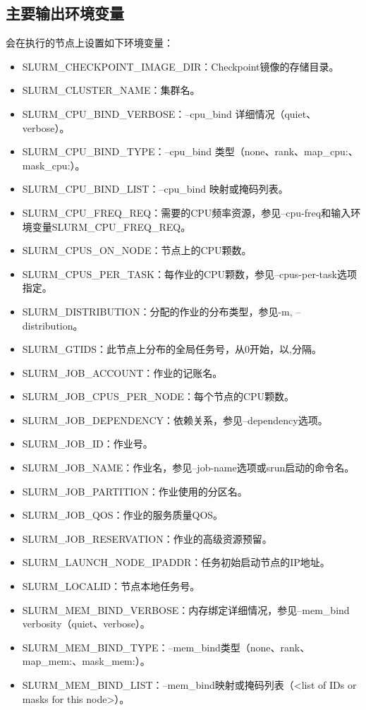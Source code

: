 \subsection{主要输出环境变量}
会在执行的节点上设置如下环境变量：
\begin{itemize}
	\item SLURM\_CHECKPOINT\_IMAGE\_DIR：Checkpoint镜像的存储目录。
	\item SLURM\_CLUSTER\_NAME：集群名。
	\item SLURM\_CPU\_BIND\_VERBOSE：--cpu\_bind 详细情况（quiet、verbose）。
	\item SLURM\_CPU\_BIND\_TYPE：--cpu\_bind 类型（none、rank、map\_cpu:、mask\_cpu:）。
	\item SLURM\_CPU\_BIND\_LIST：--cpu\_bind 映射或掩码列表。
	\item SLURM\_CPU\_FREQ\_REQ：需要的CPU频率资源，参见--cpu-freq和输入环境变量SLURM\_CPU\_FREQ\_REQ。
	\item SLURM\_CPUS\_ON\_NODE：节点上的CPU颗数。
	\item SLURM\_CPUS\_PER\_TASK：每作业的CPU颗数，参见--cpus-per-task选项指定。
	\item SLURM\_DISTRIBUTION：分配的作业的分布类型，参见-m, --distribution。
	\item SLURM\_GTIDS：此节点上分布的全局任务号，从0开始，以,分隔。
	\item SLURM\_JOB\_ACCOUNT：作业的记账名。
	\item SLURM\_JOB\_CPUS\_PER\_NODE：每个节点的CPU颗数。
	\item SLURM\_JOB\_DEPENDENCY：依赖关系，参见--dependency选项。
	\item SLURM\_JOB\_ID：作业号。
	\item SLURM\_JOB\_NAME：作业名，参见--job-name选项或srun启动的命令名。
	\item SLURM\_JOB\_PARTITION：作业使用的分区名。
	\item SLURM\_JOB\_QOS：作业的服务质量QOS。
	\item SLURM\_JOB\_RESERVATION：作业的高级资源预留。
	\item SLURM\_LAUNCH\_NODE\_IPADDR：任务初始启动节点的IP地址。
	\item SLURM\_LOCALID：节点本地任务号。
	\item SLURM\_MEM\_BIND\_VERBOSE：内存绑定详细情况，参见--mem\_bind verbosity（quiet、verbose）。
	\item SLURM\_MEM\_BIND\_TYPE：--mem\_bind类型（none、rank、map\_mem:、mask\_mem:）。
	\item SLURM\_MEM\_BIND\_LIST：--mem\_bind映射或掩码列表（<list of IDs or masks for this node>）。

\end{itemize}
